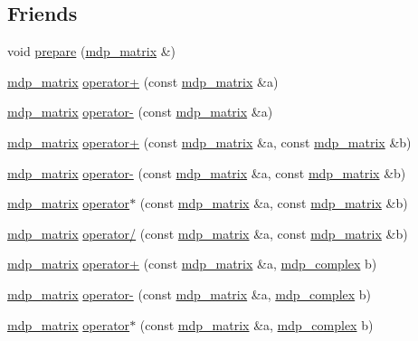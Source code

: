 \subsection*{Friends}
\begin{DoxyCompactItemize}
\item 
void \hyperlink{classmdp__matrix_a9b5dd55d85b884176c25b3f0967285f0}{prepare} (\hyperlink{classmdp__matrix}{mdp\_\-matrix} \&)
\item 
\hyperlink{classmdp__matrix}{mdp\_\-matrix} \hyperlink{classmdp__matrix_ac277f7b8abb06215be34e3db82ff6c0a}{operator+} (const \hyperlink{classmdp__matrix}{mdp\_\-matrix} \&a)
\item 
\hyperlink{classmdp__matrix}{mdp\_\-matrix} \hyperlink{classmdp__matrix_a6861cfe08a2620bce0a79c2528721884}{operator-\/} (const \hyperlink{classmdp__matrix}{mdp\_\-matrix} \&a)
\item 
\hyperlink{classmdp__matrix}{mdp\_\-matrix} \hyperlink{classmdp__matrix_a17f483c5cf65d00c950c21fb7e467a71}{operator+} (const \hyperlink{classmdp__matrix}{mdp\_\-matrix} \&a, const \hyperlink{classmdp__matrix}{mdp\_\-matrix} \&b)
\item 
\hyperlink{classmdp__matrix}{mdp\_\-matrix} \hyperlink{classmdp__matrix_a60f405280a02350fdc22b1b8b86712c6}{operator-\/} (const \hyperlink{classmdp__matrix}{mdp\_\-matrix} \&a, const \hyperlink{classmdp__matrix}{mdp\_\-matrix} \&b)
\item 
\hyperlink{classmdp__matrix}{mdp\_\-matrix} \hyperlink{classmdp__matrix_acf7cf6445d6a42f2aa791bc1088a816f}{operator$\ast$} (const \hyperlink{classmdp__matrix}{mdp\_\-matrix} \&a, const \hyperlink{classmdp__matrix}{mdp\_\-matrix} \&b)
\item 
\hyperlink{classmdp__matrix}{mdp\_\-matrix} \hyperlink{classmdp__matrix_a9966401a50b7969c45d1fc3e3290f404}{operator/} (const \hyperlink{classmdp__matrix}{mdp\_\-matrix} \&a, const \hyperlink{classmdp__matrix}{mdp\_\-matrix} \&b)
\item 
\hyperlink{classmdp__matrix}{mdp\_\-matrix} \hyperlink{classmdp__matrix_a9c3c774b4ef0650ed3ede792dd8b9bcc}{operator+} (const \hyperlink{classmdp__matrix}{mdp\_\-matrix} \&a, \hyperlink{classmdp__complex}{mdp\_\-complex} b)
\item 
\hyperlink{classmdp__matrix}{mdp\_\-matrix} \hyperlink{classmdp__matrix_ad5af014fcf319974b767e466ebbe0a41}{operator-\/} (const \hyperlink{classmdp__matrix}{mdp\_\-matrix} \&a, \hyperlink{classmdp__complex}{mdp\_\-complex} b)
\item 
\hyperlink{classmdp__matrix}{mdp\_\-matrix} \hyperlink{classmdp__matrix_a0fc0749acc8f2a3f26f0daf14797a9e5}{operator$\ast$} (const \hyperlink{classmdp__matrix}{mdp\_\-matrix} \&a, \hyperlink{classmdp__complex}{mdp\_\-complex} b)

\end{DoxyCompactItemize}
